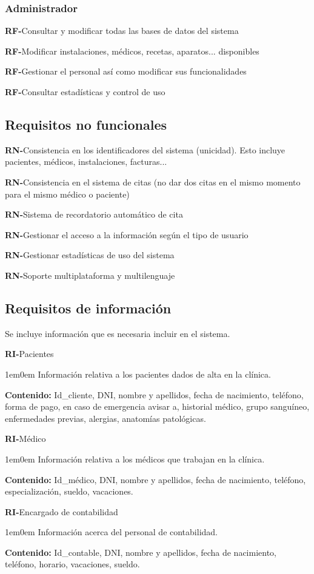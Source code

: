 \documentclass[11pt,a4paper]{article}
\newcounter{RFCounter}
\newcommand{\rf}[1]{\addtocounter{RFCounter}{1}\textbf{\rmfamily RF-\theRFCounter}\quad#1\\}
\newcounter{RNCounter}
\newcommand{\rn}[1]{\addtocounter{RNCounter}{1}\textbf{\rmfamily RN-\theRNCounter}\quad#1\\}
\newcounter{RICounter}
\newenvironment{rienv}[1]
	{\addtocounter{RICounter}{1}\textbf{\rmfamily RI-\theRICounter}\quad#1\begin{adjustwidth}{1em}{0em}}
	{\end{adjustwidth}}
\begin{document}
\subsubsection{Administrador}
    \rf{Consultar y modificar todas las bases de datos del sistema}
    \rf{Modificar instalaciones, médicos, recetas, aparatos... disponibles}
    \rf{Gestionar el personal así como modificar sus funcionalidades}
    \rf{Consultar estadísticas y control de uso}

\subsection{Requisitos no funcionales}
  \rn{Consistencia en los identificadores del sistema (unicidad). Esto incluye pacientes, médicos, instalaciones, facturas...}
  \rn{Consistencia en el sistema de citas (no dar dos citas en el mismo momento para el mismo médico o paciente)}
  \rn{Sistema de recordatorio automático de cita}
  \rn{Gestionar el acceso a la información según el tipo de usuario}
  \rn{Gestionar estadísticas de uso del sistema}
  \rn{Soporte multiplataforma y multilenguaje}


\subsection{Requisitos de información}

Se incluye información que es necesaria incluir en el sistema.

\begin{rienv}{Pacientes}
  Información relativa a los pacientes dados de alta en la clínica.

  \textbf{Contenido:} Id\_cliente, DNI, nombre y apellidos, fecha de nacimiento, teléfono, forma de pago, en caso de emergencia avisar a, historial médico, grupo sanguíneo, enfermedades previas, alergias, anatomías patológicas.
\end{rienv}

\begin{rienv}{Médico}
	Información relativa a los médicos que trabajan en la clínica.

	\textbf{Contenido:} Id\_médico, DNI, nombre y apellidos, fecha de nacimiento, teléfono, especialización, sueldo, vacaciones.
\end{rienv}

\begin{rienv}{Encargado de contabilidad}
  Información acerca del personal de contabilidad.

  \textbf{Contenido:} Id\_contable, DNI, nombre y apellidos, fecha de nacimiento, teléfono, horario, vacaciones, sueldo.
\end{rienv}  
  
\end{document}
